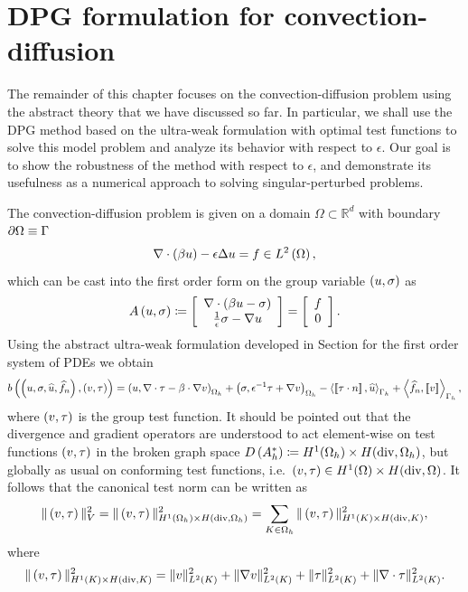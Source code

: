 \section{DPG formulation for convection-diffusion}

The remainder of this chapter focuses on the convection-diffusion problem using the abstract theory that we
have discussed so far. In particular, we shall use the DPG method based on the ultra-weak formulation with optimal test functions to solve this model problem and analyze its behavior with respect to $\epsilon$. 
Our goal is to show the robustness of the method with respect to $\epsilon$, and demonstrate its usefulness as  a numerical approach to solving singular-perturbed problems. 

The convection-diffusion problem is given on a domain
$\Omega \subset \mathbb{R}^d$ with boundary $\pO \equiv \Gamma$
\begin{equation}
\div (\beta u) - \epsilon\Delta u = f  \in \L \label{primal},
\end{equation}
which can be cast into the first order form on the group variable
$\LRp{u,\sigma}$ as
\begin{equation}
\eqnlab{CDstrong}
A \LRp{u,\sigma} \coloneqq \LRs {
\begin{array}{c}
\div (\beta u - \sigma) \\ \frac{1}{\epsilon}\sigma - \grad u
\end{array}} = \LRs{
\begin{array}{c}
f \\ 0
\end{array}
}.
\end{equation}
Using the abstract ultra-weak formulation developed in Section
 for the first order system of PDEs  we
obtain
\begin{align*}
b\left(\left(u,\sigma, \widehat{u}, \widehat{f}_n\right),
\left( v, \tau \right)\right) = \left(u,\div \tau - \beta \cdot \grad
v\right)_{\Oh} + \left(\sigma, \epsilon^{-1} \tau + \grad v\right)_{\Oh} - \LRa{
\jump{\tau\cdot n}, \widehat{u} }_{\Gh} + \LRa{ \widehat{f}_n,
  \jump{v} }_{\Gh},
\end{align*}
where $\LRp{v, \tau}$ is the group test function. It should be pointed
out that the divergence and gradient operators are understood to act
element-wise on test functions $\LRp{v, \tau}$ in the broken graph
space $ D\LRp{A_h^*} \coloneqq  H^1(\Oh) \times H({\rm div}, \Oh)$, but
globally as usual on conforming test functions, i.e.\ $ \LRp{v, \tau}
\in  H^1(\Omega) \times H({\rm div}, \Omega)$. It follows that the
canonical test norm can be written as
\[
\|\left(v, \tau\right)\|_V^2 = \|\left(v, \tau\right)\|_{H^1(\Oh) \times H({\rm div},\Oh)}^2
= \sum_{K\in \Oh} \|\left(v, \tau\right)\|_{H^1(K) \times H({\rm
    div},K)}^2,
\]
where
\[
\|\left(v, \tau \right)\|_{H^1(K) \times H({\rm div},K)}^2 =
\|v\|_{L^2(K)}^2 + \|\grad v\|_{L^2(K)}^2 + \|\tau\|_{L^2(K)}^2 +
\|\div \tau\|_{L^2(K)}^2.
\]

